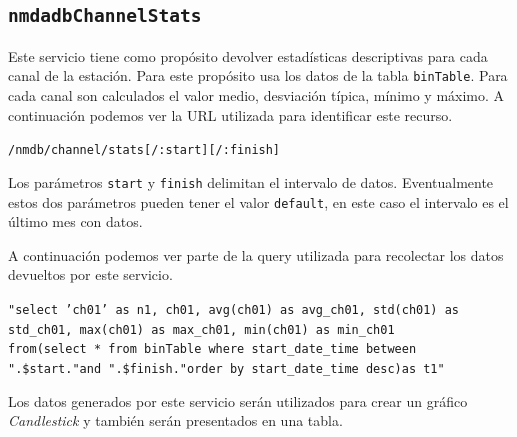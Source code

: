 {	\subsection{\texttt{nmdadbChannelStats}}
		Este servicio tiene como propósito devolver estadísticas descriptivas para cada canal de la estación. Para este propósito usa los
		datos de la tabla \texttt{binTable}. Para cada canal son calculados el valor medio, desviación típica, mínimo y máximo. A
		continuación podemos ver la URL utilizada para identificar este recurso.
	  		\begin{center} \texttt{/nmdb/channel/stats[/:start][/:finish]}  \end{center} 
		Los parámetros \texttt{start} y \texttt{finish} delimitan el intervalo de datos. Eventualmente estos dos parámetros pueden tener el
		valor \texttt{default}, en este caso el intervalo es el último mes con datos. 
		\par
		A continuación podemos ver parte de la query utilizada para recolectar los datos devueltos por este servicio.
	  		\begin{center} \texttt{"select 'ch01' as n1, ch01, avg(ch01) as avg\_ch01, std(ch01) as std\_ch01, max(ch01) as max\_ch01, min(ch01) as min\_ch01
			  		\\	from(select * from  binTable where start\_date\_time between \cc".\$start."\cc and \cc".\$finish."\cc order by start\_date\_time desc)as t1"}
			\end{center} 
		Los datos generados por este servicio serán utilizados para crear un gráfico \emph{Candlestick} y también serán presentados en una
		tabla.
}
